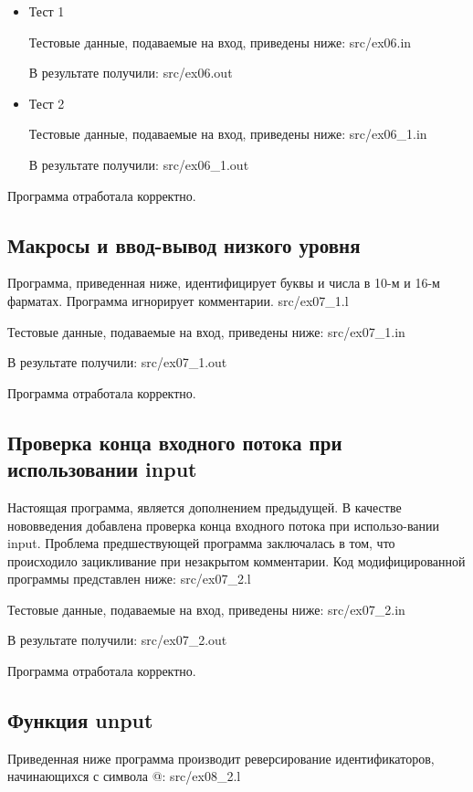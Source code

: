 \begin{itemize}
    \item Тест 1
    
    Тестовые данные, подаваемые на вход, приведены ниже:
     {src/ex06.in}
    
    В результате получили:
     {src/ex06.out}

    \item Тест 2
    
    Тестовые данные, подаваемые на вход, приведены ниже:
     {src/ex06_1.in}
    
    В результате получили:
     {src/ex06_1.out}
\end{itemize}

Программа отработала корректно.

\subsection{Макросы и ввод-вывод низкого уровня}
    Программа, приведенная ниже, идентифицирует буквы и числа в 10-м и 16-м фарматах. Программа игнорирует комментарии.
     {src/ex07_1.l}
    
    Тестовые данные, подаваемые на вход, приведены ниже:
     {src/ex07_1.in}
    
    В результате получили:
     {src/ex07_1.out}

    Программа отработала корректно.

\subsection{Проверка конца входного потока при использовании input}
    Настоящая программа, является дополнением предыдущей. 
    В качестве нововведения добавлена проверка конца входного потока при использо-вании input.
    Проблема предшествующей программа заключалась в том, что происходило зацикливание при незакрытом комментарии.
    Код модифицированной программы представлен ниже:
     {src/ex07_2.l}
    
    Тестовые данные, подаваемые на вход, приведены ниже:
     {src/ex07_2.in}
    
    В результате получили:
     {src/ex07_2.out}

    Программа отработала корректно.

\subsection{Функция unput}
    Приведенная ниже программа производит реверсирование идентификаторов, начинающихся с символа @:
     {src/ex08_2.l}

